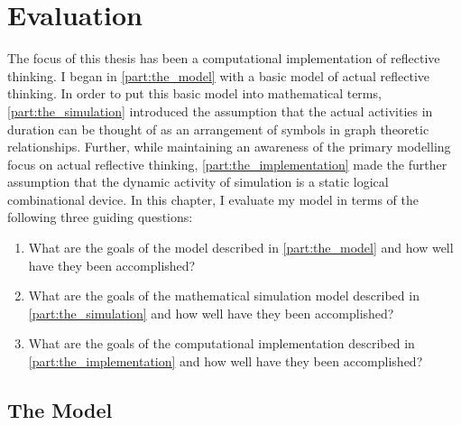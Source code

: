 \chapter{Evaluation}
\label{chapter:evaulation}

The focus of this thesis has been a computational implementation of
reflective thinking.  I began in {\mbox{\autoref{part:the_model}}}
with a basic model of actual reflective thinking.  In order to put
this basic model into mathematical terms,
{\mbox{\autoref{part:the_simulation}}} introduced the assumption that
the actual activities in duration can be thought of as an arrangement
of symbols in graph theoretic relationships.  Further, while
maintaining an awareness of the primary modelling focus on actual
reflective thinking, {\mbox{\autoref{part:the_implementation}}} made
the further assumption that the dynamic activity of simulation is a
static logical combinational device.  In this chapter, I evaluate my
model in terms of the following three guiding questions:
\begin{enumerate}
\item What are the goals of the model described in
  {\mbox{\autoref{part:the_model}}} and how well have they been
  accomplished?
\item What are the goals of the mathematical simulation model
  described in {\mbox{\autoref{part:the_simulation}}} and how well
  have they been accomplished?
\item What are the goals of the computational implementation described
  in {\mbox{\autoref{part:the_implementation}}} and how well have they
  been accomplished?
\end{enumerate}

\section{The Model}

